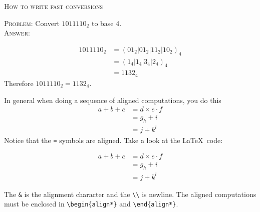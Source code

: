 \textsc{How to write fast conversions}

\textsc{Problem:} Convert $1011110_{2}$ to base 4.
\\
\textsc{Answer:}\vspace{-2mm}
\begin{answerlong}
\begin{align*}
1011110_{2} &= (01_2|01_2|11_2|10_2)_{4} \\
           &= (1_4|1_4|3_4|2_4)_{4} \\
           &= 1132_{4} 
\end{align*}
Therefore $1011110_{2} = 1132_{4}$.
\end{answerlong}

In general when doing a sequence of aligned computations, you do this
\begin{align*}
a + b + c &= d \times e \cdot f \\
          &= g_{h} + i \\ 
          &= j + k^{l} 
\end{align*}
Notice that the \verb!=! symbols are aligned.
Take a look at the \LaTeX\ code:
\begin{console}[fontsize=\footnotesize]
\begin{align*}
a + b + c &= d \times e \cdot f \\
          &= g_{h} + i \\ 
          &= j + k^{l} 
\end{align*}
\end{console}
The \verb!&! is the alignment character and the \verb!\\! is newline.  
The aligned computations must be enclosed in \verb!\begin{align*}! and
\verb!\end{align*}!.
